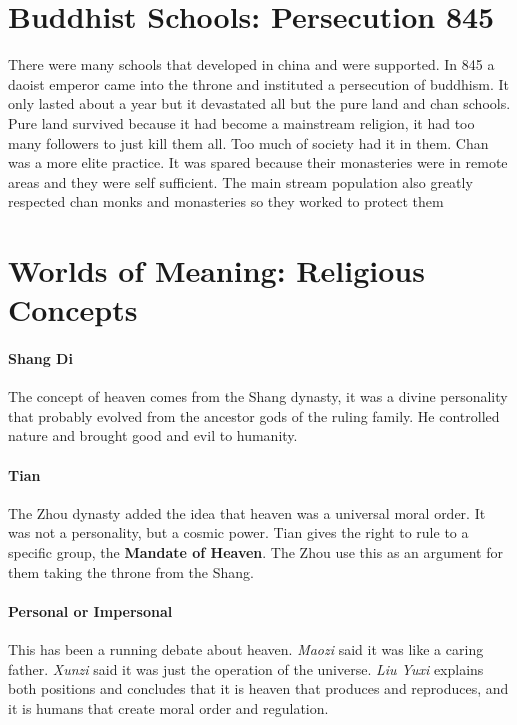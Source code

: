 \documentclass{article}
\begin{document}
\section*{Buddhist Schools: Persecution 845}
\label{sec:buddhist_schools_persecution_845}
There were many schools that developed in china and were supported. In 845 a daoist emperor came into the throne and instituted a persecution of buddhism. It only lasted about a year but it devastated all but the pure land and chan schools. Pure land survived because it had become a mainstream religion, it had too many followers to just kill them all. Too much of society had it in them. Chan was a more elite practice. It was spared because their monasteries were in remote areas and they were self sufficient. The main stream population also greatly respected chan monks and monasteries so they worked to protect them

\section*{Worlds of Meaning: Religious Concepts}
\label{sec:worlds_of_meaning_religious_concepts}

\paragraph{Shang Di}
\label{par:shang_di}
The concept of heaven comes from the Shang dynasty, it was a divine personality that probably evolved from the ancestor gods of the ruling family. He controlled nature and brought good and evil to humanity.

\paragraph{Tian}
\label{par:tian}
The Zhou dynasty added the idea that heaven was a universal moral order. It was not a personality, but a cosmic power. Tian gives the right to rule to a specific group, the \textbf{Mandate of Heaven}. The Zhou use this as an argument for them taking the throne from the Shang.

\paragraph{Personal or Impersonal}
\label{par:personal_or_impersonal}
This has been a running debate about heaven. \emph{Maozi} said it was like a caring father. \emph{Xunzi} said it was just the operation of the universe. \emph{Liu Yuxi} explains both positions and concludes that it is heaven that produces and reproduces, and it is humans that create moral order and regulation.
\end{document}
